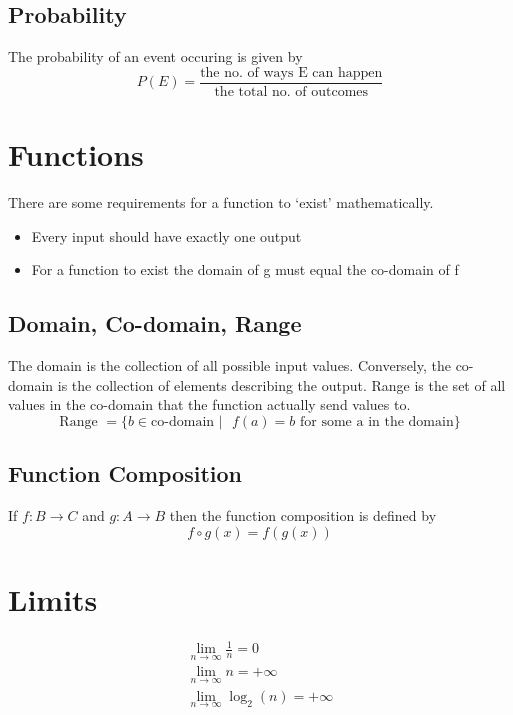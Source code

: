\documentclass[12pt] {article}
\begin{document}
\subsection*{Probability}
The probability of an event occuring is given by
\begin{equation*}
  P(E) = \frac{\text{the no. of ways E can happen}}{\text{the total no. of outcomes}}
\end{equation*}

\section*{Functions}
There are some requirements for a function to `exist' mathematically. 
\begin{itemize}
  \item Every input should have exactly one output
  \item For a function to exist the domain of g must equal the co-domain of f
\end{itemize}

\subsection*{Domain, Co-domain, Range}
The domain is the collection of all possible input values. Conversely, the co-domain is the collection of elements describing the output.
Range is the set of all values in the co-domain that the function actually send values to. 
\begin{equation*}
  \text{Range } = \{b\in\text{co-domain } | \text{ } f(a)=b \text{ for some a in the domain}\}
\end{equation*}

\subsection*{Function Composition}
If $f:B\to C$ and $g:A\to B$ then the function composition is defined by 
\begin{equation*}
  f\circ g(x) = f(g(x))
\end{equation*}

\section*{Limits}
\begin{gather*}
  \lim_{n\to\infty} \frac{1}{n} = 0 \\
  \lim_{n\to\infty} n = +\infty \\
  \lim_{n\to\infty} \log_2(n) = +\infty \\
\end{gather*}
\end{document}
